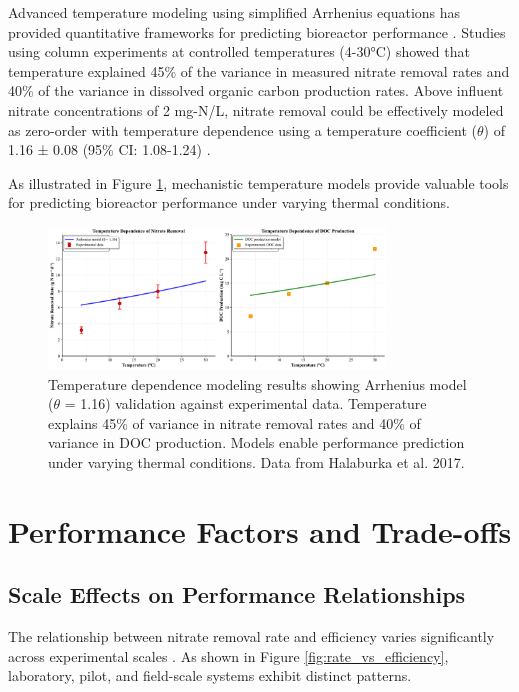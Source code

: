 \documentclass[12pt,a4paper]{article}
\begin{document}
Advanced temperature modeling using simplified Arrhenius equations has provided quantitative frameworks for predicting bioreactor performance \citep{RN242}. Studies using column experiments at controlled temperatures (4-30°C) showed that temperature explained 45\% of the variance in measured nitrate removal rates and 40\% of the variance in dissolved organic carbon production rates. Above influent nitrate concentrations of 2 mg-N/L, nitrate removal could be effectively modeled as zero-order with temperature dependence using a temperature coefficient ($\theta$) of 1.16 ± 0.08 (95\% CI: 1.08-1.24) \citep{RN242}.

As illustrated in Figure \ref{fig:temperature_modeling}, mechanistic temperature models provide valuable tools for predicting bioreactor performance under varying thermal conditions.

\begin{figure}[ht]
\centering
\includegraphics[width=0.8\textwidth]{fig10_temperature_modeling_scientific}
\caption{Temperature dependence modeling results showing Arrhenius model ($\theta$ = 1.16) validation against experimental data. Temperature explains 45\% of variance in nitrate removal rates and 40\% of variance in DOC production. Models enable performance prediction under varying thermal conditions. Data from Halaburka et al. 2017.}
\label{fig:temperature_modeling}
\end{figure}

\section{Performance Factors and Trade-offs}

\subsection{Scale Effects on Performance Relationships}

The relationship between nitrate removal rate and efficiency varies significantly across experimental scales \citep{RN312, RN310}. As shown in Figure \ref{fig:rate_vs_efficiency}, laboratory, pilot, and field-scale systems exhibit distinct patterns.
\end{document}
